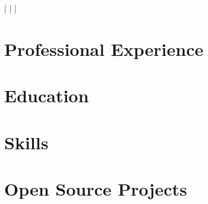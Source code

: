 \documentclass[a4paper,11pt]{article}
\begin{document}
    \begin{center}
        \myName
        \myAddress
        \myWebsite | \myMailAddress | \myGithub | \myPhoneNumber 
    \end{center}

    \section{Professional Experience}
        \begin{itemize}
            \postdoc
                \cvItemizeBegin
                    \postdocOne
                    \postdocTwo
                \cvItemizeEnd
            \expFlowers
                \cvItemizeBegin
                    \expFlowersOne
                    \expFlowersTwo
                \cvItemizeEnd
            \expTum
                \cvItemizeBegin
                    \expTumOne
                    \expTumTwo
                \cvItemizeEnd
            \expInfineon
                \cvItemizeBegin
                    \expInfineonOne
                    \expInfineonTwo
                \cvItemizeEnd
            \expEgnition
                \expEgnitionDriverless
                \expEgnitionBusinessPlan    
                \expEgnitionTeamLeader
                \expEgnitionAerodynamics
            \expSlive
            \cvItemizeBegin
                \expSliveOne
                \expSliveTwo
            \cvItemizeEnd
        \end{itemize}

    \section{Education}
        \begin{itemize}
            \phd
            \msc
            \erasmus
            \bsc
        \end{itemize}

    \section{Skills}
        \begin{itemize}
            \skillsProgramming
            \skillsLanguages
            \skillsInterests
        \end{itemize}

    \section{Open Source Projects}
        \begin{itemize}
            \fossHPZ
                \cvItemizeBegin
                    \fossHPZOne
                    \fossHPZTwo
                    \fossHPZThree
                \cvItemizeEnd
            \fossConvSnn
                \cvItemizeBegin
                    \fossConvSnnOne
                    \fossConvSnnTwo
                \cvItemizeEnd
            \fossRazerDataScience
                \cvItemizeBegin
                    \fossRazerDataScienceOne
                \cvItemizeEnd
        \end{itemize}
\end{document}
